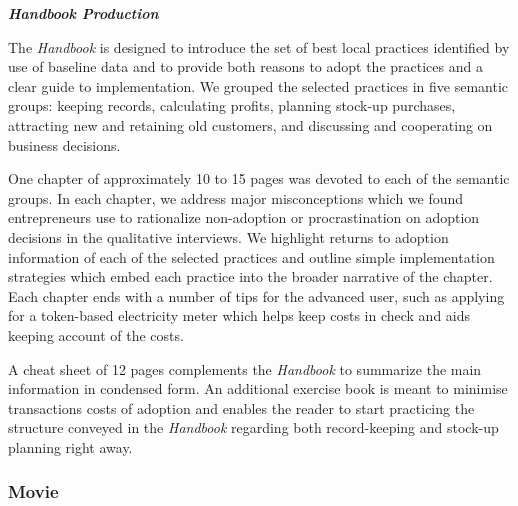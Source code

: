 \documentclass[11.5pt]{article}
\begin{document}
\noindent \emph{\textbf{Handbook Production}}\

The \emph{Handbook} is designed to introduce the set of best local practices identified by use of baseline data and to provide both reasons to adopt the practices and a clear guide to implementation. We grouped the selected practices in five semantic groups: keeping records, calculating profits, planning stock-up purchases, attracting new and retaining old customers, and discussing and cooperating on business decisions. 

One chapter of approximately 10 to 15 pages was devoted to each of the semantic groups. In each chapter, we address major misconceptions which we found entrepreneurs use to rationalize non-adoption or procrastination on adoption decisions in the qualitative interviews. We highlight returns to adoption information of each of the selected practices and outline simple implementation strategies which embed each practice into the broader narrative of the chapter. %
Each chapter ends with a number of tips for the advanced user, such as applying for a token-based electricity meter which helps keep costs in check and aids keeping account of the costs. 

A cheat sheet of 12 pages complements the \emph{Handbook} to summarize the main information in condensed form. An additional exercise book is meant to minimise transactions costs of adoption and enables the reader to start practicing the structure conveyed in the \emph{Handbook} regarding both record-keeping and stock-up planning right away.

\subsubsection{Movie}
\end{document}
